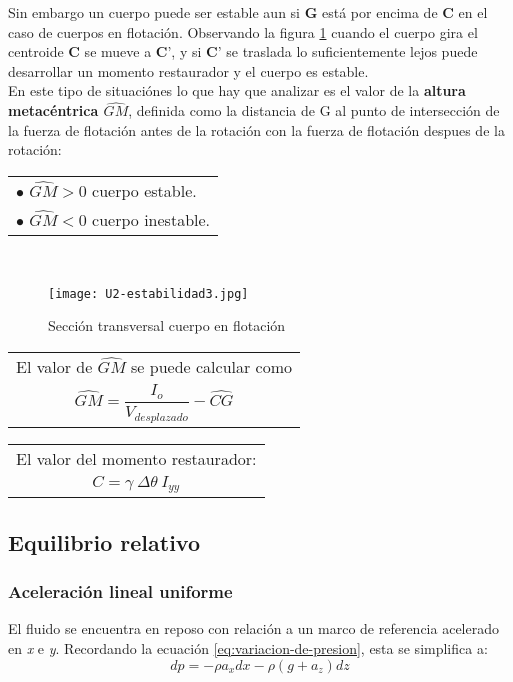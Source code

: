 Sin embargo un cuerpo puede ser estable aun si $\textbf{G}$ está por encima de $\textbf{C}$ en el caso de cuerpos en flotación. Observando la figura \ref{fig:sec-transv} cuando el cuerpo gira el centroide $\textbf{C}$ se mueve a $\textbf{C'}$, y si $\textbf{C'}$ se traslada lo suficientemente lejos puede desarrollar un momento restaurador y el cuerpo es estable.\\
En este tipo de situaciónes lo que hay que analizar es el valor de la \textbf{altura metacéntrica $\widehat{GM}$}, definida como la distancia de G al punto de intersección de la fuerza de flotación antes de la rotación con la fuerza de flotación despues de la rotación:\\
\begin{tabular}{p{\textwidth}}
	$\bullet$ $\widehat{GM}>0$ cuerpo estable.\\
	$\bullet$ $\widehat{GM}<0$ cuerpo inestable.
\end{tabular}\\
\begin{figure}[!h]
	\centering
	\texttt{[image: U2-estabilidad3.jpg]}
	\caption{Sección transversal cuerpo en flotación}
	\label{fig:sec-transv}
\end{figure}
\begin{multicols}{2}
	\begin{tabular}{c}
		El valor de $\widehat{GM}$ se puede calcular como\\
		$\widehat{GM}=\dfrac{I_{o}}{V_{desplazado}}-\widehat{CG}$\\
	\end{tabular}
	\begin{tabular}{c}
		El valor del momento restaurador:\\
		$C=\gamma~ \Delta \theta~ I_{yy}$\\
	\end{tabular}
\end{multicols}

\subsection{Equilibrio relativo}

\subsubsection{Aceleración lineal uniforme}	
El fluido se encuentra en reposo con relación a un marco de referencia acelerado en \emph{x} e \emph{y}. Recordando la ecuación \ref{eq:variacion-de-presion}, esta se simplifica a:
\begin{equation}
	dp = - \rho a_{x} dx - \rho(g + a_{z}) dz
\end{equation} 

